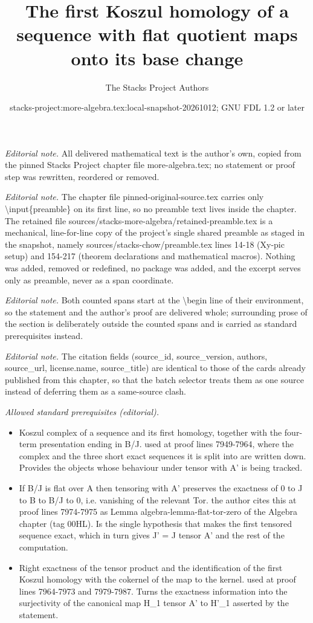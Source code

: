 \documentclass[10pt,a4paper]{amsart}
\title{The first Koszul homology of a sequence with flat quotient maps onto its base change}
\author{The Stacks Project Authors}
\date{stacks-project:more-algebra.tex:local-snapshot-20261012; GNU FDL 1.2 or later}
\theoremstyle{plain}
\theoremstyle{definition}
\theoremstyle{remark}
\numberwithin{equation}{subsection}
\begin{document}
\maketitle
\setcounter{subsection}{1}
\noindent\textit{Editorial note.} All delivered mathematical text is the author's own, copied from the pinned Stacks Project chapter file more-algebra.tex; no statement or proof step was rewritten, reordered or removed.\par\medskip
\noindent\textit{Editorial note.} The chapter file pinned-original-source.tex carries only \textbackslash{}input\{preamble\} on its first line, so no preamble text lives inside the chapter. The retained file sources/stacks-more-algebra/retained-preamble.tex is a mechanical, line-for-line copy of the project's single shared preamble as staged in the snapshot, namely sources/stacks-chow/preamble.tex lines 14-18 (Xy-pic setup) and 154-217 (theorem declarations and mathematical macros). Nothing was added, removed or redefined, no package was added, and the excerpt serves only as preamble, never as a span coordinate.\par\medskip
\noindent\textit{Editorial note.} Both counted spans start at the \textbackslash{}begin line of their environment, so the statement and the author's proof are delivered whole; surrounding prose of the section is deliberately outside the counted spans and is carried as standard prerequisites instead.\par\medskip
\noindent\textit{Editorial note.} The citation fields (source\_id, source\_version, authors, source\_url, license.name, source\_title) are identical to those of the cards already published from this chapter, so that the batch selector treats them as one source instead of deferring them as a same-source clash.\par\medskip
\noindent\textit{Allowed standard prerequisites (editorial).}\begin{itemize}
\item Koszul complex of a sequence and its first homology, together with the four-term presentation ending in B/J. used at proof lines 7949-7964, where the complex and the three short exact sequences it is split into are written down. Provides the objects whose behaviour under tensor with A' is being tracked.
\item If B/J is flat over A then tensoring with A' preserves the exactness of 0 to J to B to B/J to 0, i.e. vanishing of the relevant Tor. the author cites this at proof lines 7974-7975 as Lemma algebra-lemma-flat-tor-zero of the Algebra chapter (tag 00HL). Is the single hypothesis that makes the first tensored sequence exact, which in turn gives J' = J tensor A' and the rest of the computation.
\item Right exactness of the tensor product and the identification of the first Koszul homology with the cokernel of the map to the kernel. used at proof lines 7964-7973 and 7979-7987. Turns the exactness information into the surjectivity of the canonical map H\_1 tensor A' to H'\_1 asserted by the statement.
\end{itemize}\medskip
\end{document}
